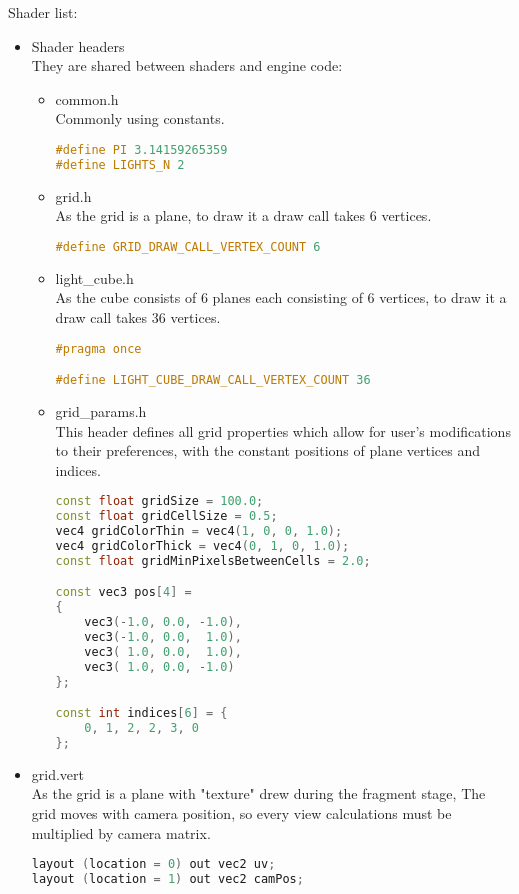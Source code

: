 Shader list:
\begin{itemize}
    \item Shader headers\\
    They are shared between shaders and engine code:
    \begin{itemize}
        \item common.h\\
        Commonly using constants.
\begin{lstlisting}[language=c++, caption=Common used shader constants (./assets/shaders/common.h)]
#define PI 3.14159265359
#define LIGHTS_N 2
\end{lstlisting}
    \item grid.h\\
    As the grid is a plane, to draw it a draw call takes 6 vertices.
\begin{lstlisting}[language=c++, caption=Grid constant (./assets/shaders/grid.h)]
#define GRID_DRAW_CALL_VERTEX_COUNT 6
\end{lstlisting}
    \item light\_cube.h\\
    As the cube consists of 6 planes each consisting of 6 vertices, to draw it a draw call takes 36 vertices.
\begin{lstlisting}[language=c++, caption=Light cubes shader constant (./assets/shaders/light\_cube.h)]
#pragma once

#define LIGHT_CUBE_DRAW_CALL_VERTEX_COUNT 36
\end{lstlisting}
    \item grid\_params.h\\
    This header defines all grid properties which allow for user's modifications to their preferences, with the constant positions of plane vertices and indices.
\begin{lstlisting}[language=c++, caption=Grid shader parameters (./assets/shaders/grid\_params.h)]
const float gridSize = 100.0;
const float gridCellSize = 0.5;
vec4 gridColorThin = vec4(1, 0, 0, 1.0);
vec4 gridColorThick = vec4(0, 1, 0, 1.0);
const float gridMinPixelsBetweenCells = 2.0;

const vec3 pos[4] =
{
    vec3(-1.0, 0.0, -1.0),
    vec3(-1.0, 0.0,  1.0),
    vec3( 1.0, 0.0,  1.0),
    vec3( 1.0, 0.0, -1.0)
};

const int indices[6] = {
    0, 1, 2, 2, 3, 0
};
\end{lstlisting}
    \end{itemize}
    \item grid.vert\\
    As the grid is a plane with "texture" drew during the fragment stage,
    The grid moves with camera position, so every view calculations must be multiplied by camera matrix.
\begin{lstlisting}[language=c++, caption=Grid vertex shader (./assets/shaders/grid.vert)]
layout (location = 0) out vec2 uv;
layout (location = 1) out vec2 camPos;


\end{lstlisting}
\end{itemize}
